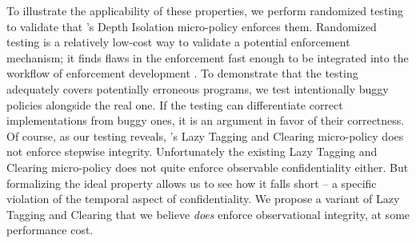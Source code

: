 \documentclass[acmsmall,review,anonymous]{acmart}\settopmatter{printfolios=true,printccs=false,printacmref=false}
\begin{document}
To illustrate the applicability of these properties, we perform randomized testing to
validate that \citeauthor{DBLP:conf/sp/RoesslerD18}'s Depth Isolation micro-policy enforces
them. Randomized testing is a relatively low-cost way to validate a potential enforcement
mechanism; it finds flaws in the enforcement fast enough to be integrated into the workflow
of enforcement development \citep{TestingNI:ICFP}. To demonstrate that the testing adequately
covers potentially erroneous programs, we test intentionally buggy policies alongside
the real one. If the testing can differentiate correct implementations from buggy ones,
it is an argument in favor of their correctness.
Of course, as our testing reveals, \citeauthor{DBLP:conf/sp/RoesslerD18}'s Lazy Tagging and
Clearing micro-policy does not enforce stepwise integrity.
Unfortunately the existing Lazy Tagging and Clearing
micro-policy does not quite enforce observable confidentiality either. %
But formalizing the ideal property allows us to see how it falls short -- a specific
violation of the temporal aspect of confidentiality.
We propose  a variant of Lazy Tagging and Clearing that we believe \emph{does} enforce
observational integrity, at some performance cost.
\end{document}
